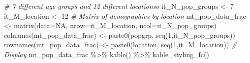 \documentclass[
]{book}
\newenvironment{Shaded}{\begin{snugshade}}{\end{snugshade}}
\newcommand{\AttributeTok}[1]{\textcolor[rgb]{0.77,0.63,0.00}{#1}}
\newcommand{\CommentTok}[1]{\textcolor[rgb]{0.56,0.35,0.01}{\textit{#1}}}
\newcommand{\ConstantTok}[1]{\textcolor[rgb]{0.00,0.00,0.00}{#1}}
\newcommand{\DecValTok}[1]{\textcolor[rgb]{0.00,0.00,0.81}{#1}}
\newcommand{\FunctionTok}[1]{\textcolor[rgb]{0.00,0.00,0.00}{#1}}
\newcommand{\NormalTok}[1]{#1}
\newcommand{\OtherTok}[1]{\textcolor[rgb]{0.56,0.35,0.01}{#1}}
\newcommand{\SpecialCharTok}[1]{\textcolor[rgb]{0.00,0.00,0.00}{#1}}
\newcommand{\StringTok}[1]{\textcolor[rgb]{0.31,0.60,0.02}{#1}}
\begin{document}
\begin{Shaded}
\begin{Highlighting}[]
\CommentTok{\# 7 different age groups and 12 different locationso}
\NormalTok{it\_N\_pop\_groups }\OtherTok{\textless{}{-}} \DecValTok{7}
\NormalTok{it\_M\_location }\OtherTok{\textless{}{-}} \DecValTok{12}
\CommentTok{\# Matrix of demographics by location}
\NormalTok{mt\_pop\_data\_frac }\OtherTok{\textless{}{-}} \FunctionTok{matrix}\NormalTok{(}\AttributeTok{data=}\ConstantTok{NA}\NormalTok{, }\AttributeTok{nrow=}\NormalTok{it\_M\_location, }\AttributeTok{ncol=}\NormalTok{it\_N\_pop\_groups)  }
\FunctionTok{colnames}\NormalTok{(mt\_pop\_data\_frac) }\OtherTok{\textless{}{-}} \FunctionTok{paste0}\NormalTok{(}\StringTok{\textquotesingle{}popgrp\textquotesingle{}}\NormalTok{, }\FunctionTok{seq}\NormalTok{(}\DecValTok{1}\NormalTok{,it\_N\_pop\_groups))}
\FunctionTok{rownames}\NormalTok{(mt\_pop\_data\_frac) }\OtherTok{\textless{}{-}} \FunctionTok{paste0}\NormalTok{(}\StringTok{\textquotesingle{}location\textquotesingle{}}\NormalTok{, }\FunctionTok{seq}\NormalTok{(}\DecValTok{1}\NormalTok{,it\_M\_location))}
\CommentTok{\# Display}
\NormalTok{mt\_pop\_data\_frac }\SpecialCharTok{\%\textgreater{}\%} \FunctionTok{kable}\NormalTok{() }\SpecialCharTok{\%\textgreater{}\%} \FunctionTok{kable\_styling\_fc}\NormalTok{()}
\end{Highlighting}
\end{Shaded}
\end{document}
